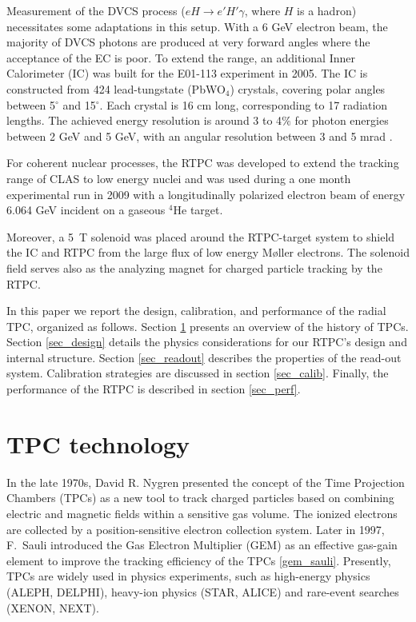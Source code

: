 \documentclass[twocolumn,showpacs,superscriptaddress,groupedaddress]{revtex4}
\begin{document}
Measurement of the DVCS process ($eH \rightarrow e' H' \gamma$, where 
$H$ is a hadron) necessitates some adaptations in this setup.
With a 6 GeV electron beam, the 
majority of DVCS photons are produced at very forward angles where the  
acceptance of the EC is poor. To extend the range, an additional 
Inner Calorimeter (IC) was built for the E01-113 experiment in 2005. The IC is 
constructed from 424 lead-tungstate (PbWO$_{4}$) crystals, covering polar 
angles between 5$^{\circ}$ and 15$^{\circ}$. Each crystal is 16 cm long,
corresponding to 17 radiation lengths. The achieved energy 
resolution is around 3 to 4$\%$ for photon energies between 2 GeV and 5 GeV, with
an angular resolution between 3 and 5 mrad 
\cite{Hyon-suk}. 


For coherent nuclear processes, the RTPC was developed to extend the tracking range of CLAS to low energy nuclei and was used during a one month experimental run in 2009 
with a longitudinally polarized electron beam of energy 6.064 GeV incident 
on a gaseous $^{4}$He target.

Moreover, a 
5~T solenoid was placed around the RTPC-target system to shield the IC and RTPC from the large flux of low energy M{\o}ller electrons. The solenoid field serves also as the
analyzing magnet for charged particle tracking by the RTPC.

In this paper we report the design, calibration, and performance of the radial TPC, organized as follows.
Section \ref{prev_tpc} presents an overview of the history of TPCs.
Section \ref{sec_design} details the physics considerations for 
our RTPC's design and internal structure. Section \ref{sec_readout} 
describes the properties of the read-out system.  Calibration strategies are
discussed in section \ref{sec_calib}. Finally, the 
performance of the RTPC is described in section \ref{sec_perf}.

\section{TPC technology} \label{prev_tpc}
In the late 1970s, David R. Nygren presented the concept of the Time Projection 
Chambers (TPCs) as a new tool to track charged particles based on combining 
electric and magnetic fields within a sensitive gas volume. The ionized 
electrons are collected by a position-sensitive electron collection system.  
Later in 1997, F.~Sauli introduced the Gas Electron Multiplier (GEM) as an 
effective gas-gain element to improve the tracking efficiency of the TPCs 
\ref{gem_sauli}. Presently, TPCs are widely used in physics experiments, 
such as high-energy physics (ALEPH, DELPHI), heavy-ion physics (STAR, ALICE) 
and rare-event searches (XENON, NEXT).
\end{document}
